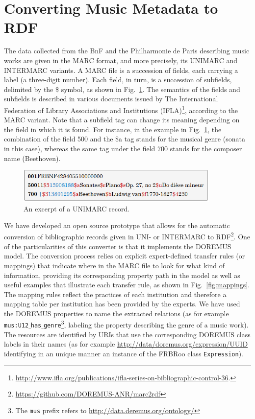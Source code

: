 \documentclass[runningheads,a4paper]{llncs}
\begin{document}
\section{Converting Music Metadata to RDF}
\label{sec:conversion}
The data collected from the BnF and the Philharmonie de Paris describing music works are given in the MARC format, and more precisely, its UNIMARC and INTERMARC variants. A MARC file is a succession of fields, each carrying a label (a three-digit number). Each field, in turn, is a succession of subfields, delimited by the \$ symbol, as shown in Fig.~\ref{fig:unimarc}. The semantics of the fields and subfields is described in various documents issued by The International Federation of Library Associations and Institutions (IFLA)\footnote{\url{http://www.ifla.org/publications/ifla-series-on-bibliographic-control-36}.}, according to the MARC variant. Note that a subfield tag can change its meaning depending on the field in which it is found. For instance, in the example in Fig.~\ref{fig:unimarc}, the combination of the field 500 and the \$a tag stands for the musical genre (sonata in this case), whereas the same tag under the field 700 stands for the composer name (Beethoven).

\begin{figure}
  \centering
  \includegraphics[width=10cm]{img/marc-exmpl-simple.png}
  \caption{An excerpt of a UNIMARC record.}
  \label{fig:unimarc}
\end{figure}

We have developed an open source prototype that allows for the automatic conversion of bibliographic records given in UNI- or INTERMARC to RDF\footnote{\url{https://github.com/DOREMUS-ANR/marc2rdf}}. One of the particularities of this converter is that it implements the DOREMUS model. The conversion process relies on explicit expert-defined transfer rules (or mappings) that indicate where in the MARC file to look for what kind of information, providing its corresponding property path in the model as well as useful examples that illustrate each transfer rule, as shown in Fig.~\ref{fig:mappings}. The mapping rules reflect the practices of each institution and therefore a mapping table per institution has been provided by the experts. We have used the DOREMUS properties to name the extracted relations (as for example \texttt{mus:U12$\_$has$\_$genre}\footnote{The \texttt{mus} prefix refers to \url{http://data.deremus.org/ontology/}}, labeling the property describing the genre of a music work). The resources are identified by URIs that use the corresponding DOREMUS class labels in their names (as for example \url{http://data/doremus.org/expression/UUID} identifying in an unique manner an instance of the FRBRoo class \texttt{Expression}).
\end{document}
